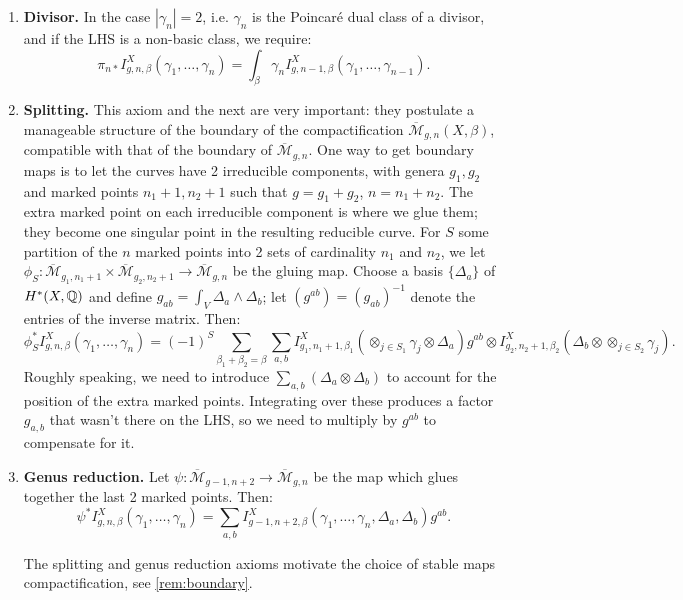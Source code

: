 \begin{defin}[2.2 in \cite{km_gw}]
\begin{enumerate}
\item \textbf{Divisor.} In the case $|\gamma_n| = 2$, i.e. $\gamma_n$ is the Poincar\'e dual class of a divisor,
and if the LHS is a non-basic class, we require:
\[	\pi_{n*}I_{g,n,\beta}^X(\gamma_1, \dots, \gamma_n) = \int_{\beta}\gamma_n I_{g,n-1,\beta}^X(\gamma_1, \dots, \gamma_{n-1}).	\]

\item \textbf{Splitting.} This axiom and the next are very important: they postulate a manageable structure of the boundary
of the compactification $\overline{\mathcal{M}}_{g,n}(X,\beta)$, compatible with that of the boundary of $\overline{\mathcal{M}}_{g,n}$.
One way to get boundary maps is to let the curves have 2 irreducible components, with genera $g_1, g_2$ and marked points
$n_1 +1, n_2+1$ such that $g = g_1 + g_2$, $n = n_1+n_2$. The extra marked point on each irreducible component is where we glue them;
they become one singular point in the resulting reducible curve. For $S$ some partition of the $n$ marked points into 2 sets of
cardinality $n_1$ and $n_2$, we let $\phi_S : \overline{\mathcal{M}}_{g_1,n_1+1} \times \overline{\mathcal{M}}_{g_2,n_2+1} \to
\overline{\mathcal{M}}_{g,n}$ be the gluing map. Choose a basis $\{\Delta_a\}$ of $H^*(X,\mathbb Q)$ and define $g_{ab} = \int_V
\Delta_a \wedge \Delta_b$; let $(g^{ab}) = (g_{ab})^{-1}$ denote the entries of the inverse matrix. Then:
\[	\phi_S^* I^X_{g,n,\beta}(\gamma_1, \dots, \gamma_n) = (-1)^S \sum_{\beta_1 + \beta_2 = \beta} \sum_{a,b}
I^X_{g_1,n_1+1,\beta_1}(\otimes_{j\in S_1} \gamma_j \otimes \Delta_a) g^{ab} \otimes I^X_{g_2,n_2+1,\beta_2}(\Delta_b
\otimes \otimes_{j\in S_2} \gamma_j). 	\]
Roughly speaking, we need to introduce $\sum_{a,b}(\Delta_a \otimes \Delta_b)$ to account for the position of the extra marked points.
Integrating over these produces a factor $g_{a,b}$ that wasn't there on the LHS, so we need to multiply by $g^{ab}$ to
compensate for it.

\item \textbf{Genus reduction.} Let $\psi : \overline{\mathcal{M}}_{g-1,n+2}\to \overline{\mathcal{M}}_{g,n}$ be the map
which glues together the last 2 marked points. Then:
\[	\psi^*	I^X_{g,n,\beta}(\gamma_1, \dots, \gamma_n) = \sum_{a,b} 
I^X_{g-1,n+2,\beta}(\gamma_1, \dots, \gamma_n, \Delta_a,\Delta_b) g^{ab}.\]

The splitting and genus reduction axioms motivate the choice of stable maps compactification, see \ref{rem:boundary}.


\end{enumerate}
\end{defin}
